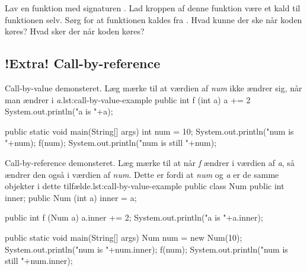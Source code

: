         \begin{exercise}
            Lav en funktion med signaturen . Lad
            kroppen af denne funktion være et kald til funktionen
            selv. Sørg for at funktionen kaldes fra .
            Hvad kunne der ske når koden køres? Hvad sker der når
            koden køres?
        \end{exercise}

    \subsection{!Extra! Call-by-reference}



        \begin{JavaCode}{Call-by-value demonsteret. Læg mærke til at værdien af \emph{num} ikke ændrer sig, når man ændrer i \emph{a}.}{lst:call-by-value-example}
            public int f (int a) {
                a += 2
                System.out.println("a is "+a);
            }

            public static void main(String[] args) {
                int num = 10;
                System.out.println("num is "+num);
                f(num);
                System.out.println("num is still "+num);
            }
        \end{JavaCode}

        \begin{JavaCode}{Call-by-reference demonsteret. Læg mærke til at når \emph{f} ændrer i værdien af \emph{a}, så ændrer den også i værdien af \emph{num}. Dette er fordi at \emph{num} og \emph{a} er de samme objekter i dette tilfælde.}{lst:call-by-value-example}
            public class Num {
                public int inner;
                public Num (int a) { inner = a; }
            }

            public int f (Num a) {
                a.inner += 2;
                System.out.println("a is "+a.inner);
            }

            public static void main(String[] args) {
                Num num = new Num(10);
                System.out.println("num is "+num.inner);
                f(num);
                System.out.println("num is still "+num.inner);
            }
        \end{JavaCode}

